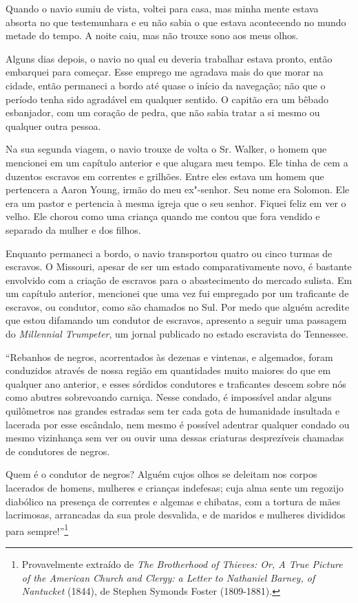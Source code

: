 Quando o navio sumiu de vista, voltei para casa, mas minha mente estava
absorta no que testemunhara e eu não sabia o que estava acontecendo no
mundo metade do tempo. A noite caiu, mas não trouxe sono aos meus olhos.

Alguns dias depois, o navio no qual eu deveria trabalhar estava pronto,
então embarquei para começar. Esse emprego me agradava mais do que morar
na cidade, então permaneci a bordo até quase o início da navegação; não
que o período tenha sido agradável em qualquer sentido. O capitão era um
bêbado esbanjador, com um coração de pedra, que não sabia tratar a si
mesmo ou qualquer outra pessoa.

Na sua segunda viagem, o navio trouxe de volta o Sr. Walker, o homem que
mencionei em um capítulo anterior e que alugara meu tempo. Ele tinha de
cem a duzentos escravos em correntes e grilhões. Entre eles estava um
homem que pertencera a Aaron Young, irmão do meu ex"-senhor. Seu nome era
Solomon. Ele era um pastor e pertencia à mesma igreja que o seu senhor.
Fiquei feliz em ver o velho. Ele chorou como uma criança quando me
contou que fora vendido e separado da mulher e dos filhos.

Enquanto permaneci a bordo, o navio transportou quatro ou cinco turmas
de escravos. O Missouri, apesar de ser um estado comparativamente novo,
é bastante envolvido com a criação de escravos para o abastecimento do
mercado sulista. Em um capítulo anterior, mencionei que uma vez fui
empregado por um traficante de escravos, ou condutor, como são chamados
no Sul. Por medo que alguém acredite que estou difamando um condutor de
escravos, apresento a seguir uma passagem do \emph{Millennial
Trumpeter}, um jornal publicado no estado escravista do Tennessee.

``Rebanhos de negros, acorrentados às dezenas e vintenas, e algemados, %
foram conduzidos através de nossa região em quantidades muito maiores do
que em qualquer ano anterior, e esses sórdidos condutores e traficantes
descem sobre nós como abutres sobrevoando carniça. Nesse condado, é
impossível andar alguns quilômetros nas grandes estradas sem ter cada
gota de humanidade insultada e lacerada por esse escândalo, nem mesmo é
possível adentrar qualquer condado ou mesmo vizinhança sem ver ou ouvir
uma dessas criaturas desprezíveis chamadas de condutores de negros.

Quem é o condutor de negros? Alguém cujos olhos se deleitam nos corpos
lacerados de homens, mulheres e crianças indefesas; cuja alma sente um
regozijo diabólico na presença de correntes e algemas e chibatas, com a
tortura de mães lacrimosas, arrancadas da sua prole desvalida, e de
maridos e mulheres divididos para sempre!''\footnote{Provavelmente
  extraído de \emph{The Brotherhood of Thieves: Or, A True Picture of
  the American Church and Clergy: a Letter to Nathaniel Barney, of
  Nantucket} (1844), de Stephen Symonds Foster (1809-1881).}

